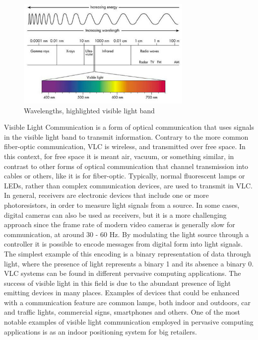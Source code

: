 \label{sectionVLC}
\begin{figure}[hbt]
	\centering
  \includegraphics[height=200px]{img/wavelengths}
  \caption{Wavelengths, highlighted visible light band}
  \label{fig:wavelength}
\end{figure}

Visible Light Communication is a form of optical communication that uses signals in the visible light band to transmit information.
Contrary to the more common fiber-optic communication, VLC is wireless, and transmitted over free space.
In this context, for free space it is meant air, vacuum, or something similar, in contrast to other forms of optical communication that channel transmission into cables or others, like it is for fiber-optic.
Typically, normal fluorescent lamps or LEDs, rather than complex communication devices,  are used to transmit in VLC.
In general, receivers are electronic devices that include one or more photoresistors, in order to measure light signals from a source.
In some cases, digital cameras can also be used as receivers, but it is a more challenging approach since the frame rate of modern video cameras is generally slow for communication, at around 30 - 60 Hz.
By modulating the light source through a controller it is possible to encode messages from digital form into light signals.
The simplest example of this encoding is a binary representation of data through light, where the presence of light represents a binary 1 and its absence a binary 0.
VLC systems can be found in different pervasive computing applications.
The success of visible light in this field is due to the abundant presence of light emitting devices in many places.
Examples of devices that could be enhanced with a communication feature are common lamps, both indoor and outdoors, car and traffic lights, commercial signs, smartphones and others.
One of the most notable examples of visible light communication employed in pervasive computing applications is as an indoor positioning system for big retailers.
\newline 
